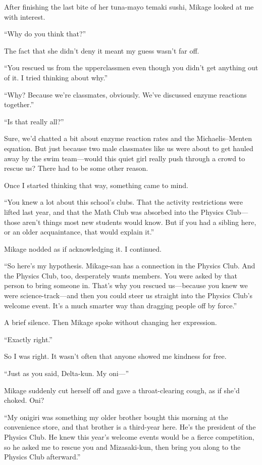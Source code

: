 \documentclass[
    a4paper,
    12pt,
    twoside,
    openany,
    UTF8,
    fontset=windows
]{ctexbook}
\begin{document}
After finishing the last bite of her tuna-mayo temaki sushi, Mikage looked at me with interest.

``Why do you think that?''

The fact that she didn't deny it meant my guess wasn't far off.

``You rescued us from the upperclassmen even though you didn't get anything out of it. I tried thinking about why.''

``Why? Because we're classmates, obviously. We've discussed enzyme reactions together.''

``Is that really all?''

Sure, we'd chatted a bit about enzyme reaction rates and the Michaelis--Menten equation. But just because two male classmates like us were about to get hauled away by the swim team---would this quiet girl really push through a crowd to rescue us? There had to be some other reason.

Once I started thinking that way, something came to mind.

``You knew a lot about this school's clubs. That the activity restrictions were lifted last year, and that the Math Club was absorbed into the Physics Club---those aren't things most new students would know. But if you had a sibling here, or an older acquaintance, that would explain it.''

Mikage nodded as if acknowledging it. I continued.

``So here's my hypothesis. Mikage-san has a connection in the Physics Club. And the Physics Club, too, desperately wants members. You were asked by that person to bring someone in. That's why you rescued us---because you knew we were science-track---and then you could steer us straight into the Physics Club's welcome event. It's a much smarter way than dragging people off by force.''

A brief silence. Then Mikage spoke without changing her expression.

``Exactly right.''

So I was right. It wasn't often that anyone showed me kindness for free.

``Just as you said, Delta-kun. My oni---''

Mikage suddenly cut herself off and gave a throat-clearing cough, as if she'd choked. Oni?

``My onigiri was something my older brother bought this morning at the convenience store, and that brother is a third-year here. He's the president of the Physics Club. He knew this year's welcome events would be a fierce competition, so he asked me to rescue you and Mizasaki-kun, then bring you along to the Physics Club afterward.''
\end{document}
